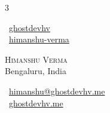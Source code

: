 \documentclass[a4paper,10pt]{extarticle}
\begin{document}

\pagestyle{empty} %





\begin{multicols}{3}
\raggedright
\normalsize \faGithub\ {\href{https://github.com/ghostdevhv}{ghostdevhv}}\\[4pt]
\normalsize \faLinkedinSquare\ {\href{https://www.linkedin.com/in/himanshu-verma-1b930990/}{himanshu-verma}}

\columnbreak

\centering
{\huge\textsc{Himanshu Verma}}\\[4pt]
\normalsize Bengaluru, India

\columnbreak

\raggedleft
\normalsize \faEnvelope\ {\href{mailto:himanshu@ghostdevhv.me}{himanshu@ghostdevhv.me}}\\[4pt]
\normalsize \faGlobe\ {\href{https://ghostdevhv.me/}{ghostdevhv.me}}
\end{multicols}
\end{document}
